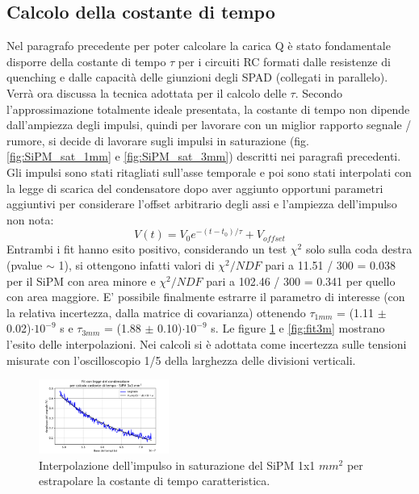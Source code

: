 \documentclass[journal]{IEEEtran}
\begin{document}
\subsection{Calcolo della costante di tempo}
Nel paragrafo precedente per poter calcolare la carica Q è stato fondamentale disporre della costante di tempo $\tau$ per i circuiti RC formati dalle resistenze di quenching e dalle capacità delle giunzioni degli SPAD (collegati in parallelo). Verrà ora discussa la tecnica adottata per il calcolo delle $\tau$. Secondo l'approssimazione totalmente ideale presentata, la costante di tempo non dipende dall'ampiezza degli impulsi, quindi per lavorare con un miglior rapporto segnale / rumore, si decide di lavorare sugli impulsi in saturazione (fig. \ref{fig:SiPM_sat_1mm} e \ref{fig:SiPM_sat_3mm}) descritti nei paragrafi precedenti. Gli impulsi sono stati ritagliati sull'asse temporale e poi sono stati interpolati con la legge di scarica del condensatore dopo aver aggiunto opportuni parametri aggiuntivi per considerare l'offset arbitrario degli assi e l'ampiezza dell'impulso non nota:
\begin{equation}
    V(t) = V_0 e^{-(t-t_0)/\tau} + V_{offset}
\end{equation}
Entrambi i fit hanno esito positivo, considerando un test $\chi^2$ solo sulla coda destra (pvalue $\sim$ 1), si ottengono infatti valori di $\chi^2 / NDF$ pari a 11.51  /  300 = 0.038 per il SiPM con area minore e $\chi^2 / NDF$ pari a 102.46 /  300 = 0.341 per quello con area maggiore. E' possibile finalmente estrarre il parametro di interesse (con la relativa incertezza, dalla matrice di covarianza) ottenendo $\tau_{1mm}$ = (1.11 $\pm$ 0.02)$\cdot 10^{-9}$ s e $\tau_{3mm}$ = (1.88 $\pm$ 0.10)$\cdot 10^{-9}$ s. Le figure \ref{fig:fit1m} e \ref{fig:fit3m} mostrano l'esito delle interpolazioni. Nei calcoli si è adottata come incertezza sulle tensioni misurate con l'oscilloscopio 1/5 della larghezza delle divisioni verticali.

\begin{figure}[H]%
\begin{center}
\includegraphics[width=0.38\textwidth]{analysis/output/SiPM_fit_3mm.pdf}
\caption{Interpolazione dell'impulso in saturazione del SiPM 1x1 $mm^2$ per estrapolare la costante di tempo caratteristica.}
\label{fig:fit1m}
\end{center}
\end{figure}
\end{document}
